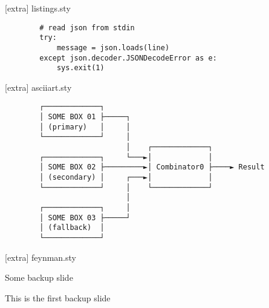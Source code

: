 \documentclass[%
    aspectratio=169,  %
]{beamer}
\begin{document}
\begin{frame}[fragile]{[extra] listings.sty}
    \begin{verbatim}
        # read json from stdin
        try:
            message = json.loads(line)
        except json.decoder.JSONDecodeError as e:
            sys.exit(1)
    \end{verbatim}
\end{frame}


\begin{frame}[fragile]{[extra] asciiart.sty}
    \begin{lstlisting}
        ┌─────────────┐
        │ SOME BOX 01 ├─────┐
        │ (primary)   │     │
        └─────────────┘     │
                            │    ┌─────────────┐
        ┌─────────────┐     └───►│             │
        │ SOME BOX 02 ├─────────►│ Combinator0 ├────► Result
        │ (secondary) │     ┌───►│             │
        └─────────────┘     │    └─────────────┘
                            │
        ┌─────────────┐     │
        │ SOME BOX 03 ├─────┘
        │ (fallback)  │
        └─────────────┘
    \end{lstlisting}
\end{frame}


\begin{frame}[fragile]{[extra] feynman.sty}
  \begin{center}
  \end{center}
\end{frame}


\backupbegin%
\begin{frame}{Some backup slide}
  \begin{center}
    This is the first backup slide
  \end{center}
\end{frame}
\backupend%
\end{document}

